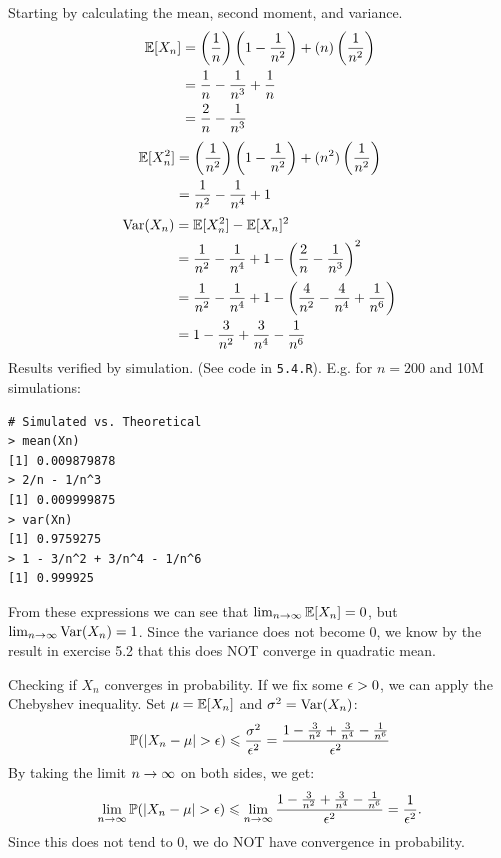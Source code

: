\newpage\noindent
Starting by calculating the mean, second moment, and variance.
\begin{align*}
    \mathbb{E}[X_n] &= \left(\frac{1}{n}\right)\left(1 - \frac{1}{n^2}\right) + (n)\left(\frac{1}{n^2}\right)\\
    &= \frac{1}{n} - \frac{1}{n^3} + \frac{1}{n} \\
    &= \frac{2}{n} - \frac{1}{n^3}
\end{align*}
\begin{align*}
    \mathbb{E}[X_n^2] &= \left(\frac{1}{n^2}\right)\left(1 - \frac{1}{n^2}\right) + (n^2)\left(\frac{1}{n^2}\right)\\
    &= \frac{1}{n^2} - \frac{1}{n^4} + 1
\end{align*}
\begin{align*}
    \text{Var}(X_n) &= \mathbb{E}[X_n^2] - \mathbb{E}[X_n]^2 \\
    &= \frac{1}{n^2} - \frac{1}{n^4} + 1 - \left(\frac{2}{n} - \frac{1}{n^3}\right)^2 \\
    &= \frac{1}{n^2} - \frac{1}{n^4} + 1 - \left(\frac{4}{n^2} - \frac{4}{n^4} + \frac{1}{n^6}\right) \\
    &= 1 - \frac{3}{n^2} + \frac{3}{n^4} - \frac{1}{n^6}
\end{align*}
Results verified by simulation. (See code in \texttt{5.4.R}). E.g. for $n=200$ and 10M simulations:
\begin{lstlisting}[style=RSyntax, title=R]
# Simulated vs. Theoretical
> mean(Xn)
[1] 0.009879878
> 2/n - 1/n^3
[1] 0.009999875
> var(Xn)
[1] 0.9759275
> 1 - 3/n^2 + 3/n^4 - 1/n^6
[1] 0.999925
\end{lstlisting}
From these expressions we can see that $\lim_{n\rightarrow\infty} \mathbb{E}[X_n] = 0$, but $\lim_{n\rightarrow\infty} \text{Var}(X_n) = 1$.
Since the variance does not become 0, we know by the result in exercise 5.2 that this does
NOT converge in quadratic mean.

Checking if $X_n$ converges in probability. If we fix some $\epsilon > 0$, we can apply
the Chebyshev inequality. Set $\mu = \mathbb{E}[X_n]$ and $\sigma^2 = \text{Var}(X_n)$:
$$
\mathbb{P}(|X_n -\mu| > \epsilon) \leqslant \frac{\sigma^2}{\epsilon^2}
= \frac{1 - \frac{3}{n^2} + \frac{3}{n^4} - \frac{1}{n^6}}{\epsilon^2}
$$
By taking the limit $n\rightarrow\infty$ on both sides, we get:
$$
\lim_{n\rightarrow\infty} \mathbb{P}(|X_n -\mu| > \epsilon)
\leqslant
\lim_{n\rightarrow\infty} \frac{1 - \frac{3}{n^2} + \frac{3}{n^4} - \frac{1}{n^6}}{\epsilon^2}
= \frac{1}{\epsilon^2}.
$$
Since this does not tend to 0, we do NOT have convergence in probability.

